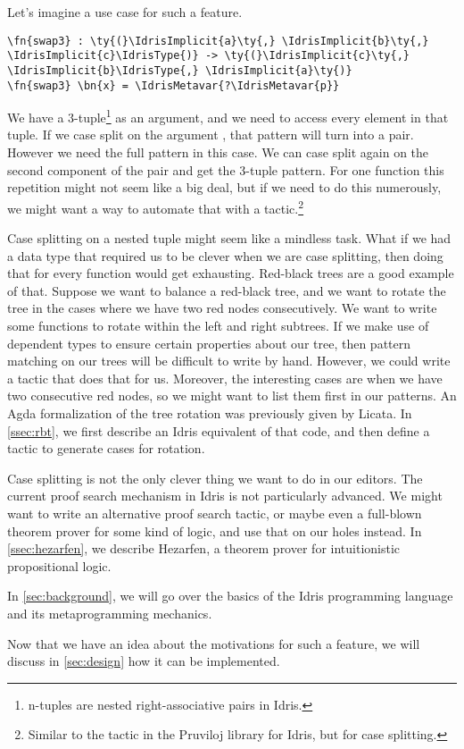 Let's imagine a use case for such a feature.
\begin{Verbatim}[framesep=2mm, label=\footnotesize{\normalfont{Idris}}, labelposition=topline]
\fn{swap3} : \ty{(}\IdrisImplicit{a}\ty{,} \IdrisImplicit{b}\ty{,} \IdrisImplicit{c}\IdrisType{)} -> \ty{(}\IdrisImplicit{c}\ty{,} \IdrisImplicit{b}\IdrisType{,} \IdrisImplicit{a}\ty{)}
\fn{swap3} \bn{x} = \IdrisMetavar{?\IdrisMetavar{p}}
\end{Verbatim}
We have a 3-tuple\footnote{n-tuples are nested right-associative pairs in
Idris.} as an argument, and we need to access every element in that tuple.
If we case split on the argument , that pattern will turn into
a pair. However we need the full  pattern in this
case. We can case split again on the second component of the pair and get the
3-tuple pattern.
For one function this repetition might not seem like a big deal, but if we need
to do this numerously, we might want a way to automate that with a
tactic.\footnote{Similar to the  tactic in the Pruviloj library
for Idris, but for case splitting.}

Case splitting on a nested tuple might seem like a mindless task. What if we
had a data type that required us to be clever when we are case splitting,
then doing that for every function would get exhausting.
Red-black trees\cite{okasakiRedBlack} are a good example of that.
Suppose we want to balance a red-black tree, and we want to rotate the tree in
the cases where we have two red nodes consecutively. We want to write some
functions to rotate within the left and right subtrees. If we make use of
dependent types to ensure certain properties about our tree, then pattern
matching on our trees will be difficult to write by hand. However, we could
write a tactic that does that for us. Moreover, the interesting cases are when
we have two consecutive red nodes, so we might want to list them first in our
patterns.  An Agda formalization of the tree rotation was previously given by
Licata\cite{licataOPLSS}. In \autoref{ssec:rbt}, we first describe an Idris
equivalent of that code, and then define a tactic to generate cases for
rotation.

Case splitting is not the only clever thing we want to do in our editors.
The current proof search mechanism in Idris is not particularly advanced.
We might want to write an alternative proof search tactic, or maybe even a
full-blown theorem prover for some kind of logic, and use that on our holes
instead. In \autoref{ssec:hezarfen}, we describe Hezarfen, a theorem prover for
intuitionistic propositional logic.


In \autoref{sec:background}, we will go over the basics of the Idris
programming language and its metaprogramming mechanics.

Now that we have an idea about the motivations for such a feature, we will
discuss in \autoref{sec:design} how it can be implemented.


